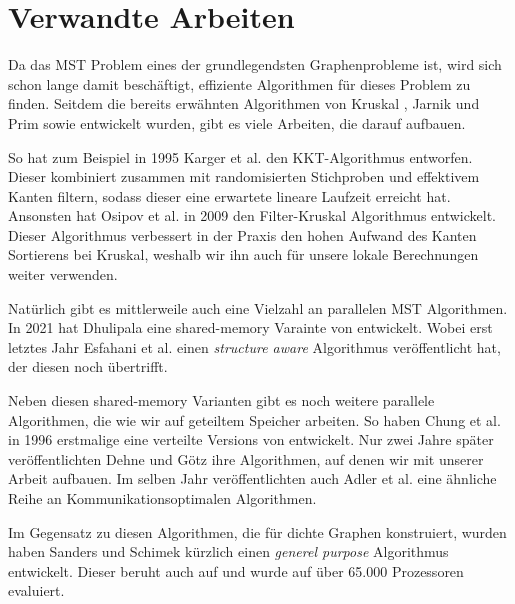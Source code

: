\section{Verwandte Arbeiten}\label{RelatedWork}

Da das MST Problem eines der grundlegendsten Graphenprobleme ist, wird sich schon lange damit beschäftigt, effiziente Algorithmen für dieses Problem zu finden. Seitdem die bereits erwähnten Algorithmen von Kruskal \cite{kruskal1956shortest}, Jarnik und Prim \cite{prim1957shortest} sowie \boruvka \cite{boruuvka1926jistem} entwickelt wurden, gibt es viele Arbeiten, die darauf aufbauen.

So hat zum Beispiel in 1995 Karger et al. \cite{karger1995randomized} den KKT-Algorithmus entworfen. Dieser kombiniert \boruvka zusammen mit randomisierten Stichproben und effektivem Kanten filtern, sodass dieser eine erwartete lineare Laufzeit erreicht hat.
Ansonsten hat Osipov et al. \cite{osipov2009filter} in 2009 den Filter-Kruskal Algorithmus entwickelt. 
Dieser Algorithmus verbessert in der Praxis den hohen Aufwand des Kanten Sortierens bei Kruskal, weshalb wir ihn auch für unsere lokale Berechnungen weiter verwenden. 

Natürlich gibt es mittlerweile auch eine Vielzahl an parallelen MST Algorithmen. In 2021 hat Dhulipala \cite{dhulipala2021theoretically} eine shared-memory Varainte von \boruvkasAlgorithmus entwickelt. Wobei erst letztes Jahr Esfahani et al. \cite{koohi2022mastiff} einen \textit{structure aware} Algorithmus veröffentlicht hat, der diesen noch übertrifft.

Neben diesen shared-memory Varianten gibt es noch weitere parallele Algorithmen, die wie wir auf geteiltem Speicher arbeiten. So haben Chung et al. \cite{chung1996parallel} in 1996 erstmalige eine verteilte Versions von \boruvkasAlgorithmus entwickelt. Nur zwei Jahre später veröffentlichten Dehne und Götz \cite{dehne1998practical} ihre Algorithmen, auf denen wir mit unserer Arbeit aufbauen.
Im selben Jahr veröffentlichten auch Adler et al. \cite{adler1998communication} eine ähnliche Reihe an Kommunikationsoptimalen Algorithmen.

Im Gegensatz zu diesen Algorithmen, die für dichte Graphen konstruiert, wurden haben Sanders und Schimek \cite{sanders2023engineering} kürzlich einen \textit{generel purpose} Algorithmus entwickelt. Dieser beruht auch auf \boruvkasAlgorithmus und wurde auf über 65.000 Prozessoren evaluiert.

